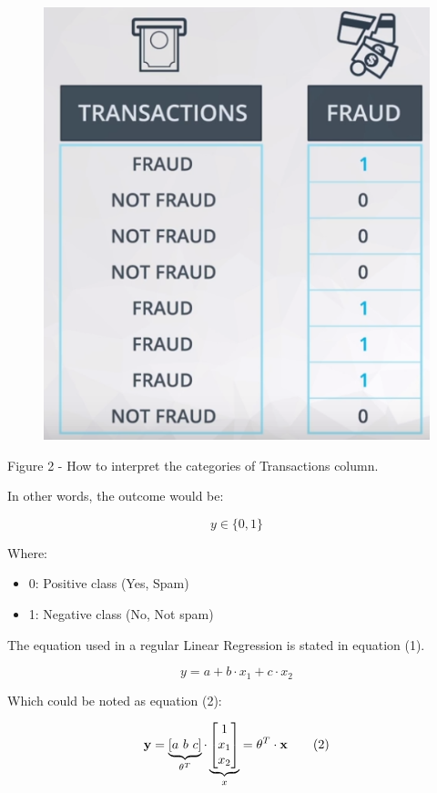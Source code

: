 \documentclass[]{book}
\providecommand{\tightlist}{%
  \setlength{\itemsep}{0pt}\setlength{\parskip}{0pt}}
\begin{document}
\begin{figure}
\centering
\includegraphics{01-img/c4_l16_02.png}
\caption{}
\end{figure}

Figure 2 - How to interpret the categories of Transactions column.

In other words, the outcome would be:

\[y \in \{0,1\}\]

Where:

\begin{itemize}
\tightlist
\item
  0: Positive class (Yes, Spam)
\item
  1: Negative class (No, Not spam)
\end{itemize}

The equation used in a regular Linear Regression is stated in equation
(1).

\[ y = a + b \cdot x_1 + c \cdot x_2   \tag{1}\]

Which could be noted as equation (2):

\[ \bold y = \underbrace{[a \ b \ c]}_{\theta^T} \cdot \underbrace{\begin{bmatrix} 1 \\ x_1 \\ x_2\end{bmatrix}}_{x} = \theta^T \cdot \bold x \tag{2}\]
\end{document}
